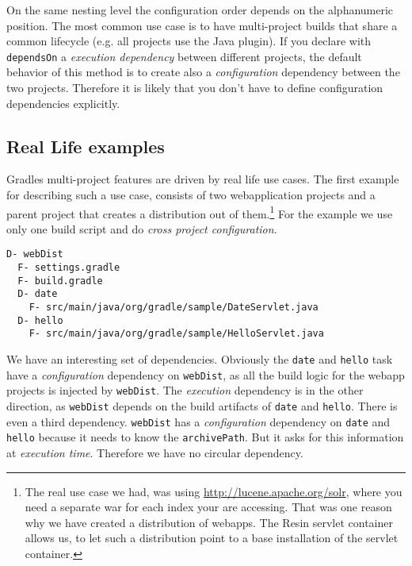 On the same nesting level the configuration order depends on the alphanumeric position. The most common use case is to have multi-project builds that share a common lifecycle (e.g. all projects use the Java plugin). If you declare with \texttt{dependsOn} a \emph{execution dependency} between different projects, the default behavior of this method is to create also a \emph{configuration} dependency between the two projects. Therefore it is likely that you don't have to define configuration dependencies explicitly. 

\subsection{Real Life examples} %
\label{sub:real_life_examples}
Gradles multi-project features are driven by real life use cases. The first example for describing such a use case, consists of two webapplication projects and a parent project that creates a distribution out of them.\footnote{The real use case we had, was using \url{http://lucene.apache.org/solr}, where you need a separate war for each index your are accessing. That was one reason why we have created a distribution of webapps. The Resin servlet container allows us, to let such a distribution point to a base installation of the servlet container.} For the example we use only one build script and do \emph{cross project configuration}.
\begin{Verbatim}[frame=single,label=Project Tree]
D- webDist
  F- settings.gradle
  F- build.gradle
  D- date
    F- src/main/java/org/gradle/sample/DateServlet.java
  D- hello
    F- src/main/java/org/gradle/sample/HelloServlet.java
\end{Verbatim}
We have an interesting set of dependencies. Obviously the \texttt{date} and \texttt{hello} task have a \emph{configuration} dependency on \texttt{webDist}, as all the build logic for the webapp projects is injected by \texttt{webDist}. The \emph{execution} dependency is in the other direction, as \texttt{webDist} depends on the build artifacts of \texttt{date} and \texttt{hello}. There is even a third dependency. \texttt{webDist} has a \emph{configuration} dependency on \texttt{date} and \texttt{hello} because it needs to know the \texttt{archivePath}. But it asks for this information at \emph{execution time}. Therefore we have no circular dependency.

